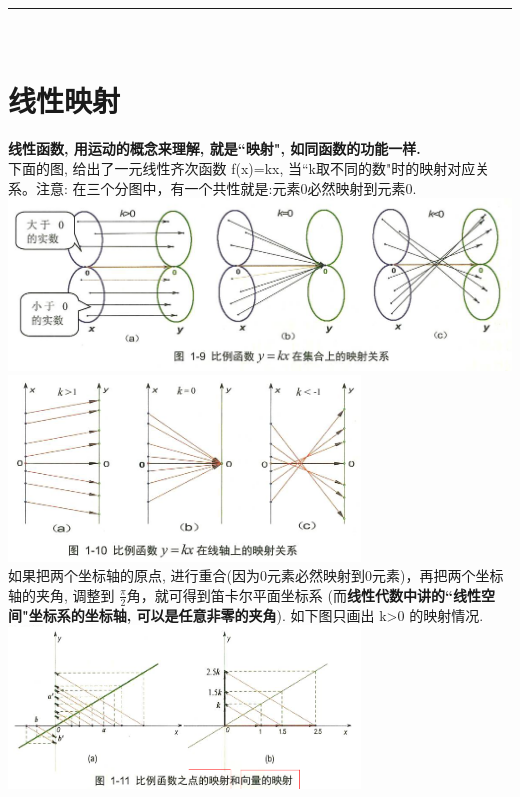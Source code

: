 \documentclass[UTF8]{ctexart}
\begin{document}
~\\
\hrule
~\\



\section{线性映射}

\textbf{线性函数, 用运动的概念来理解, 就是``映射", 如同函数的功能一样.} \\


下面的图, 给出了一元线性齐次函数 f(x)=kx,  当``k取不同的数"时的映射对应关系。注意: 在三个分图中，有一个共性就是:元素0必然映射到元素0. \\

\includegraphics[width=1\textwidth]{img/0116.png} \\

\includegraphics[width=0.7\textwidth]{img/0117.png}\\


如果把两个坐标轴的原点, 进行重合(因为0元素必然映射到0元素)，再把两个坐标轴的夹角, 调整到 $\frac{\pi}{2}$角，就可得到笛卡尔平面坐标系 (而\textbf{线性代数中讲的``线性空间"坐标系的坐标轴, 可以是任意非零的夹角}). 如下图只画出 k>0 的映射情况. \\
\includegraphics[width=0.7\textwidth]{img/0118.png}\\
\end{document}
